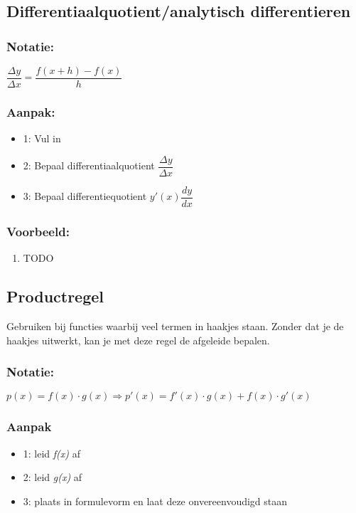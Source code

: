 \documentclass[11pt]{article}
\begin{document}
\subsection{Differentiaalquotient/analytisch differentieren}
\label{sec:orgb5d5a01}
\subsubsection{Notatie:}
\label{sec:orge4580d8}
\(\dfrac{\Delta y}{\Delta x} = \dfrac{f(x+h) - f(x)}{h}\)
\subsubsection{Aanpak:}
\label{sec:org0f94640}
\begin{itemize}
\item 1: Vul in
\item 2: Bepaal differentiaalquotient \(\dfrac{\Delta y}{\Delta x}\)
\item 3: Bepaal differentiequotient \(y'(x) \dfrac{dy}{dx}\)
\end{itemize}
\subsubsection{Voorbeeld:}
\label{sec:orgcbb103c}
\begin{enumerate}
\item TODO
\label{sec:orgb30e905}
\end{enumerate}


\subsection{Productregel}
\label{sec:orgcb94e51}
Gebruiken bij functies waarbij veel termen in haakjes staan.
Zonder dat je de haakjes uitwerkt, kan je met deze regel de afgeleide bepalen.
\subsubsection{Notatie:}
\label{sec:org7670d32}
\(p(x) = f(x) \cdot g(x) \Rightarrow p'(x) = f'(x) \cdot g(x) + f(x) \cdot g'(x)\)
\subsubsection{Aanpak}
\label{sec:org7fe790d}
\begin{itemize}
\item 1: leid \textit{f(x)} af
\item 2: leid \textit{g(x)} af
\item 3: plaats in formulevorm en laat deze onvereenvoudigd staan
\end{itemize}
\end{document}
